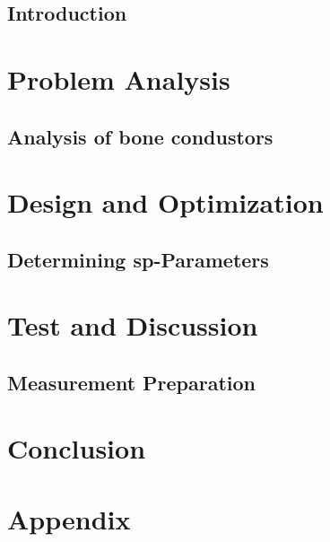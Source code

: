 \glsresetall
 \graphicspath{{figures/analysing/}}
\chapter{Introduction}\label{ch:intro}



\part{Problem Analysis}\label{pt:analysis} \glsresetall
\graphicspath{{figures/analysis/}}
\chapter{Analysis of bone condustors}\label{ch:bone_conductors}




\part{Design and Optimization}\label{pt:design} 
\graphicspath{{figures/design/}}	
\chapter{Determining \gls{sp}-Parameters}\label{ch:optimization}


\part{Test and Discussion}\label{pt:test}
\graphicspath{{figures/tests/}}
\chapter{Measurement Preparation}


 
\part{Conclusion}\label{pt:conclusion}



\glsresetall
\appendix %

 \graphicspath{{figures/appendix/}}
\part{Appendix}\label{pt:appendix}

